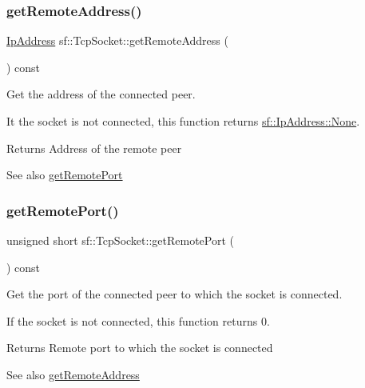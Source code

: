 \subsubsection{\texorpdfstring{get\+Remote\+Address()}{getRemoteAddress()}}
{\footnotesize\ttfamily \hyperlink{classsf_1_1_ip_address}{Ip\+Address} sf\+::\+Tcp\+Socket\+::get\+Remote\+Address (\begin{DoxyParamCaption}{ }\end{DoxyParamCaption}) const}



Get the address of the connected peer. 

It the socket is not connected, this function returns \hyperlink{classsf_1_1_ip_address_a4619b4abbe3c8fef056e7299db967404}{sf\+::\+Ip\+Address\+::\+None}.

\begin{DoxyReturn}{Returns}
Address of the remote peer
\end{DoxyReturn}
\begin{DoxySeeAlso}{See also}
\hyperlink{classsf_1_1_tcp_socket_a93bced0afd4b1c60797a85725be04951}{get\+Remote\+Port} 
\end{DoxySeeAlso}
\mbox{\label{classsf_1_1_tcp_socket_a93bced0afd4b1c60797a85725be04951}} 
\subsubsection{\texorpdfstring{get\+Remote\+Port()}{getRemotePort()}}
{\footnotesize\ttfamily unsigned short sf\+::\+Tcp\+Socket\+::get\+Remote\+Port (\begin{DoxyParamCaption}{ }\end{DoxyParamCaption}) const}



Get the port of the connected peer to which the socket is connected. 

If the socket is not connected, this function returns 0.

\begin{DoxyReturn}{Returns}
Remote port to which the socket is connected
\end{DoxyReturn}
\begin{DoxySeeAlso}{See also}
\hyperlink{classsf_1_1_tcp_socket_aa8579c203b1fd21beb74d7f76444a94c}{get\+Remote\+Address} 
\end{DoxySeeAlso}
\mbox{\label{classsf_1_1_tcp_socket_a90ce50811ea61d4f00efc62bb99ae1af}} 
